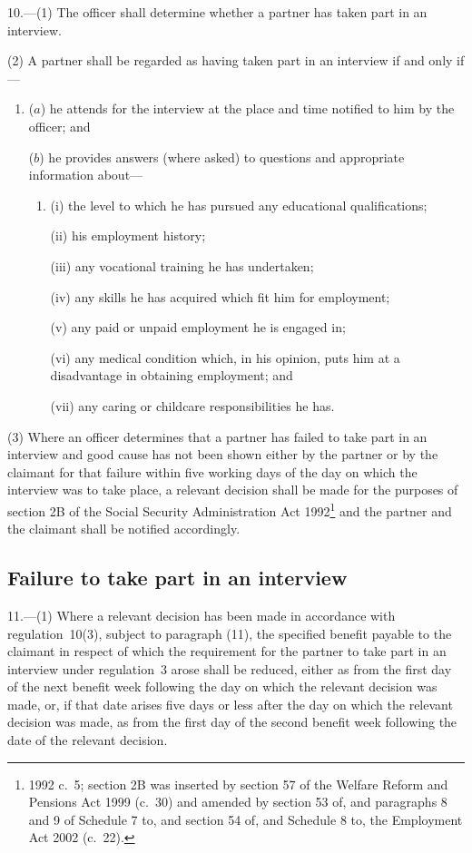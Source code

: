 \documentclass[12pt,a4paper]{article}
\begin{document}
10.---(1)  The officer shall determine whether a partner has taken part in an interview.

(2) A partner shall be regarded as having taken part in an interview if and only if—
\begin{enumerate}\item[]
($a$) he attends for the interview at the place and time notified to him by the officer; and

($b$) he provides answers (where asked) to questions and appropriate information about—
\begin{enumerate}\item[]
(i) the level to which he has pursued any educational qualifications;

(ii) his employment history;

(iii) any vocational training he has undertaken;

(iv) any skills he has acquired which fit him for employment;

(v) any paid or unpaid employment he is engaged in;

(vi) any medical condition which, in his opinion, puts him at a disadvantage in obtaining employment; and

(vii) any caring or childcare responsibilities he has.
\end{enumerate}
\end{enumerate}

(3) Where an officer determines that a partner has failed to take part in an interview and good cause has not been shown either by the partner or by the claimant for that failure within five working days of the day on which the interview was to take place, a relevant decision shall be made for the purposes of section 2B of the Social Security Administration Act 1992\footnote{1992 c.~5; section 2B was inserted by section 57 of the Welfare Reform and Pensions Act 1999 (c.~30) and amended by section 53 of, and paragraphs 8 and 9 of Schedule 7 to, and section 54 of, and Schedule 8 to, the Employment Act 2002 (c.~22).} and the partner and the claimant shall be notified accordingly.

\subsection[11. Failure to take part in an interview]{Failure to take part in an interview}

11.---(1)  Where a relevant decision has been made in accordance with regulation~10(3), subject to paragraph (11), the specified benefit payable to the claimant in respect of which the requirement for the partner to take part in an interview under regulation~3 arose shall be reduced, either as from the first day of the next benefit week following the day on which the relevant decision was made, or, if that date arises five days or less after the day on which the relevant decision was made, as from the first day of the second benefit week following the date of the relevant decision.
\end{document}
